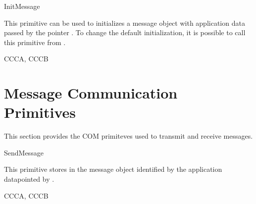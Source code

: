 \begin{function}{InitMessage}
  \begin{fundescription}
    This primitive can be used to initializes a message object with application data
    passed by the pointer . To change the default initialization, it is possible 
    to call this primitive from .
  \end{fundescription}
  \begin{funparameters}
  \end{funparameters}
  \begin{funreturn}
  \end{funreturn}
  \begin{funconformance}
    CCCA, CCCB
  \end{funconformance}
\end{function}

\pagebreak


\section{Message Communication Primitives}
This section provides the COM primiteves used to transmit and receive messages.

\begin{function}{SendMessage}
  \begin{fundescription}
    This primitive stores in the message object identified by  the 
    application datapointed by .
  \end{fundescription}
  \begin{funparameters}
  \end{funparameters}
  \begin{funreturn}
  \end{funreturn}
  \begin{funconformance}
    CCCA, CCCB
  \end{funconformance}
\end{function}


